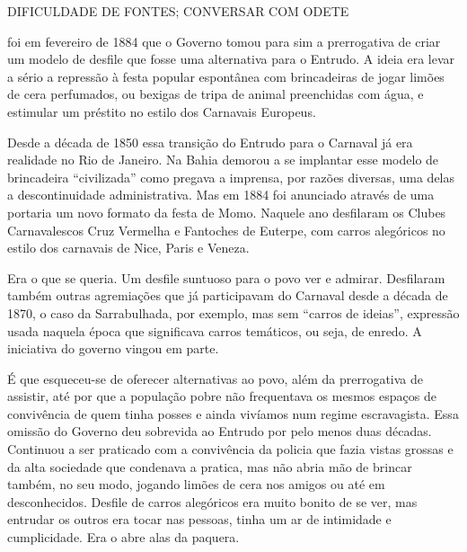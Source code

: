 DIFICULDADE DE FONTES; CONVERSAR COM ODETE

foi em fevereiro de 1884 que o Governo tomou para sim a prerrogativa de criar um modelo de desfile que fosse uma alternativa para o Entrudo. A ideia era levar a sério a repressão à festa popular espontânea com brincadeiras de jogar limões de cera perfumados, ou bexigas de tripa de animal preenchidas com água, e estimular um préstito no estilo dos Carnavais Europeus.

Desde a década de 1850 essa transição do Entrudo para o Carnaval já era realidade no Rio de Janeiro. Na Bahia demorou a se implantar esse modelo de brincadeira “civilizada” como pregava a imprensa, por razões diversas, uma delas a descontinuidade administrativa. Mas em 1884 foi anunciado através de uma portaria um novo formato da festa de Momo. Naquele ano desfilaram os Clubes Carnavalescos Cruz Vermelha e Fantoches de Euterpe, com carros alegóricos no estilo dos carnavais de Nice, Paris e Veneza.

Era o que se queria. Um desfile suntuoso para o povo ver e admirar. Desfilaram também outras agremiações que já participavam do Carnaval desde a década de 1870, o caso da Sarrabulhada, por exemplo, mas sem “carros de ideias”, expressão usada naquela época que significava carros temáticos, ou seja, de enredo. A iniciativa do governo vingou em parte.

É que esqueceu-se de oferecer alternativas ao povo, além da prerrogativa de assistir, até por que a população pobre não frequentava os mesmos espaços de convivência de quem tinha posses e ainda vivíamos num regime escravagista. Essa omissão do Governo deu sobrevida ao Entrudo por pelo menos duas décadas. Continuou a ser praticado com a convivência da policia que fazia vistas grossas e da alta sociedade que condenava a pratica, mas não abria mão de brincar também, no seu modo, jogando limões de cera nos amigos ou até em desconhecidos. Desfile de carros alegóricos era muito bonito de se ver, mas entrudar os outros era tocar nas pessoas, tinha um ar de intimidade e cumplicidade. Era o abre alas da paquera. \cite{cadena_130carnaval_2017}

